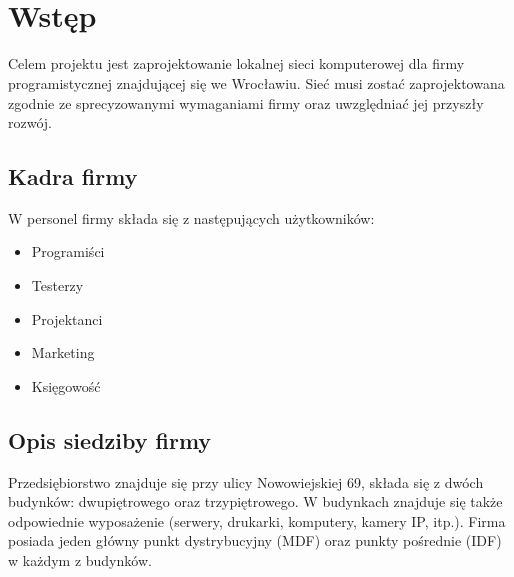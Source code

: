 \documentclass[a4paper,12pt]{extarticle}  %
\title{\tytul \\ \small{\opis}}
\author{\tworcy}
\date{\data}
\begin{document}
\maketitle
\tableofcontents
\listoftables
\cleardoublepage
\section{Wstęp}
Celem projektu jest zaprojektowanie lokalnej sieci komputerowej dla firmy programistycznej znajdującej się we Wrocławiu.
Sieć musi zostać zaprojektowana zgodnie ze sprecyzowanymi wymaganiami firmy oraz uwzględniać jej przyszły rozwój.
\subsection{Kadra firmy}

W personel firmy składa się z następujących użytkowników:
\begin{itemize}\label{itemize:kadra}
	\item Programiści
	\item Testerzy
	\item Projektanci
	\item Marketing
	\item Księgowość
\end{itemize}
\subsection{Opis siedziby firmy}
Przedsiębiorstwo znajduje się przy ulicy Nowowiejskiej 69\label{address}, składa się z dwóch budynków: dwupiętrowego oraz trzypiętrowego.
W budynkach znajduje się także odpowiednie wyposażenie (serwery,  drukarki,
komputery,  kamery  IP,  itp.).
Firma posiada jeden główny punkt dystrybucyjny (MDF) oraz punkty pośrednie (IDF) w każdym z budynków.
\end{document}
